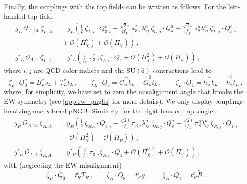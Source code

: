 \documentclass[preprintnumbers,nofootinbib,showpacs,eqsecnum,pre,12pt]{revtex4-1}
\newcommand{\SU}{\text{SU}}
\begin{document}
Finally, the couplings with the top fields can be written as follows. For the left-handed top field:
\begin{subequations} \label{eq:mixingAL0}
\begin{align}
y_{L}\, \mathcal{O}_{A,14}\ \zeta_{L,\bar A} &= y_{L} \left( \frac{1}{2}\ \zeta_{L,i} \cdot Q^{c}_{3,i}  -\frac{\sqrt 2 i}{4 f_\chi}\ \pi^*_{3,i} \lambda^a_{ij}\ \zeta_{L,j} \cdot Q^a_8 -\frac{\sqrt 2 i}{4 f_\chi}\  \pi^a_8 \lambda^a_{ij}\  \zeta_{L,j}\cdot Q^{c}_{3,i} \right. \nonumber \\  & \left. \phantom{\frac{1}{2}}+\mathcal{O}(\Pi^2_\chi) + \mathcal{O} (\Pi_\psi) \right)\, ,\label{eq:mixingAL}\\
%
y'_{L}\, \mathcal{O}_{A,1}\ \zeta_{L,\bar A} &= y'_{L} \left(\frac{i}{f_\chi}\ \pi^*_{3,i} \zeta_{L,i}\cdot Q_{1}+\mathcal{O}(\Pi^2_\chi) + \mathcal{O} (\Pi_\psi)\right)\,,
\end{align}
\end{subequations}
where $i,j$ are QCD color indices and the $\SU(5)$ contractions lead to
\begin{equation} \label{eq:zetaLQ}
     \zeta_{L} \cdot Q^c_3 = B_L^c b_L + T_L^c t_L\,, \qquad \zeta_{L} \cdot Q_8 = \tilde{G}^+_u b_L - \tilde{G}^0_u t_L\,, \qquad \zeta_{L} \cdot Q_1 = \tilde{h}^+_u b_L - \tilde{h}^0_u t_L\,,
\end{equation}
where, for simplicity, we have set to zero the misalignment angle that breaks the EW symmetry (see \cref{app:ew_pngbs} for more details).
We only display couplings involving one colored pNGB.
Similarly, for the right-handed top singlet:
\begin{subequations}
\label{eq:mixingAR0} \begin{align}
y_{R}\, \mathcal{O}_{A,14}\ \zeta_{R,\bar A} &= y_{R} \left( \frac{1}{2}\ \zeta_{R,i} \cdot Q_{3,i}  -\frac{\sqrt 2 i}{4 f_\chi}\ \pi_{3,i} \lambda^a_{ij}\ \zeta_{R,j} \cdot Q^a_8 -\frac{\sqrt 2 i}{4 f_\chi}\  \pi^a_8 \lambda^a_{ij}\  \zeta_{R,j}\cdot Q_{3,i} \right. \nonumber \\  & \left. \phantom{\frac{1}{2}}+\mathcal{O}(\Pi^2_\chi) + \mathcal{O} (\Pi_\psi) \right)\, ,\label{eq:mixingAR}\\
%
y'_{R}\, \mathcal{O}_{A,1}\ \zeta_{R,\bar A} &= y'_{R} \left(\frac{i}{f_\chi}\ \pi_{3,i} \zeta_{R,i}\cdot Q_{1}+\mathcal{O}(\Pi^2_\chi) + \mathcal{O} (\Pi_\psi)\right)\,,
\end{align}
\end{subequations}
with (neglecting the EW misalignment)
\begin{equation} \label{eq:zetaRQ}
     \zeta_{R} \cdot Q_3 = t_R^c T_R\,, \qquad \zeta_{R} \cdot Q_8 = t_R^c \tilde{g}\,, \qquad \zeta_{R} \cdot Q_1 = t_R^c \tilde{B}\,.
\end{equation}
\end{document}

